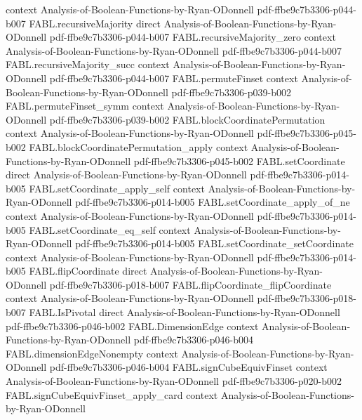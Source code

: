 \begin{theorem}
  {context}
  {Analysis-of-Boolean-Functions-by-Ryan-ODonnell}
  {pdf-ffbe9c7b3306-p044-b007}
\proofstep
  {FABL.recursiveMajority}
  {direct}
  {Analysis-of-Boolean-Functions-by-Ryan-ODonnell}
  {pdf-ffbe9c7b3306-p044-b007}
\proofstep
  {FABL.recursiveMajority_zero}
  {context}
  {Analysis-of-Boolean-Functions-by-Ryan-ODonnell}
  {pdf-ffbe9c7b3306-p044-b007}
\proofstep
  {FABL.recursiveMajority_succ}
  {context}
  {Analysis-of-Boolean-Functions-by-Ryan-ODonnell}
  {pdf-ffbe9c7b3306-p044-b007}
\proofstep
  {FABL.permuteFinset}
  {context}
  {Analysis-of-Boolean-Functions-by-Ryan-ODonnell}
  {pdf-ffbe9c7b3306-p039-b002}
\proofstep
  {FABL.permuteFinset_symm}
  {context}
  {Analysis-of-Boolean-Functions-by-Ryan-ODonnell}
  {pdf-ffbe9c7b3306-p039-b002}
\proofstep
  {FABL.blockCoordinatePermutation}
  {context}
  {Analysis-of-Boolean-Functions-by-Ryan-ODonnell}
  {pdf-ffbe9c7b3306-p045-b002}
\proofstep
  {FABL.blockCoordinatePermutation_apply}
  {context}
  {Analysis-of-Boolean-Functions-by-Ryan-ODonnell}
  {pdf-ffbe9c7b3306-p045-b002}
\proofstep
  {FABL.setCoordinate}
  {direct}
  {Analysis-of-Boolean-Functions-by-Ryan-ODonnell}
  {pdf-ffbe9c7b3306-p014-b005}
\proofstep
  {FABL.setCoordinate_apply_self}
  {context}
  {Analysis-of-Boolean-Functions-by-Ryan-ODonnell}
  {pdf-ffbe9c7b3306-p014-b005}
\proofstep
  {FABL.setCoordinate_apply_of_ne}
  {context}
  {Analysis-of-Boolean-Functions-by-Ryan-ODonnell}
  {pdf-ffbe9c7b3306-p014-b005}
\proofstep
  {FABL.setCoordinate_eq_self}
  {context}
  {Analysis-of-Boolean-Functions-by-Ryan-ODonnell}
  {pdf-ffbe9c7b3306-p014-b005}
\proofstep
  {FABL.setCoordinate_setCoordinate}
  {context}
  {Analysis-of-Boolean-Functions-by-Ryan-ODonnell}
  {pdf-ffbe9c7b3306-p014-b005}
\proofstep
  {FABL.flipCoordinate}
  {direct}
  {Analysis-of-Boolean-Functions-by-Ryan-ODonnell}
  {pdf-ffbe9c7b3306-p018-b007}
\proofstep
  {FABL.flipCoordinate_flipCoordinate}
  {context}
  {Analysis-of-Boolean-Functions-by-Ryan-ODonnell}
  {pdf-ffbe9c7b3306-p018-b007}
\proofstep
  {FABL.IsPivotal}
  {direct}
  {Analysis-of-Boolean-Functions-by-Ryan-ODonnell}
  {pdf-ffbe9c7b3306-p046-b002}
\proofstep
  {FABL.DimensionEdge}
  {context}
  {Analysis-of-Boolean-Functions-by-Ryan-ODonnell}
  {pdf-ffbe9c7b3306-p046-b004}
\proofstep
  {FABL.dimensionEdgeNonempty}
  {context}
  {Analysis-of-Boolean-Functions-by-Ryan-ODonnell}
  {pdf-ffbe9c7b3306-p046-b004}
\proofstep
  {FABL.signCubeEquivFinset}
  {context}
  {Analysis-of-Boolean-Functions-by-Ryan-ODonnell}
  {pdf-ffbe9c7b3306-p020-b002}
\proofstep
  {FABL.signCubeEquivFinset_apply_card}
  {context}
  {Analysis-of-Boolean-Functions-by-Ryan-ODonnell}

\end{theorem}
